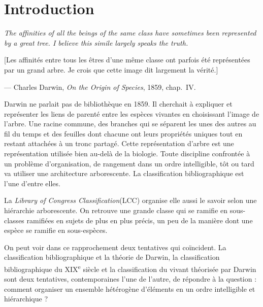 
\chapter*{Introduction}
\label{chap:introduction}

\begin{flushright}
\begin{minipage}{0.75\textwidth}
\raggedleft
\itshape
The affinities of all the beings of the same class have sometimes been represented by a great tree. I believe this simile largely speaks the truth.

\upshape
\small
[Les affinités entre tous les êtres d'une même classe ont parfois été représentées par un grand arbre. Je crois que cette image dit largement la vérité.]

\vspace{0.3em}
--- Charles Darwin, \textit{On the Origin of Species}, 1859, chap.~IV.
\end{minipage}
\end{flushright}

\vspace{1.5em}


Darwin ne parlait pas de bibliothèque en 1859. Il cherchait à expliquer et représenter les liens de parenté entre les espèces vivantes en choisissant l'image de l'arbre. Une racine commune, des branches qui se séparent les unes des autres au fil du temps et des feuilles dont chacune ont leurs propriétés uniques tout en restant attachées à un tronc partagé.
Cette représentation d'arbre est une représentation utilisée bien au-delà de la biologie. Toute discipline confrontée à un problème d'organisation, de rangement dans un ordre intelligible, tôt ou tard va utiliser une architecture arborescente. La classification bibliographique est l'une d'entre elles.

La \textit{Library of Congress Classification}(LCC) organise elle aussi le savoir selon une hiérarchie arborescente. On retrouve une grande classe qui se ramifie en sous-classes ramifiées en sujets de plus en plus précis, un peu de la manière dont une espèce se ramifie en sous-espèces. 

On peut voir dans ce rapprochement deux tentatives qui coïncident. La classification bibliographique et la théorie de Darwin, la classification bibliographique du XIX\textsuperscript{e} siècle et la classification du vivant théorisée par Darwin sont deux tentatives, contemporaines l'une de l'autre, de répondre à la question : comment organiser un ensemble hétérogène d'éléments en un ordre intelligible et hiérarchique ?

